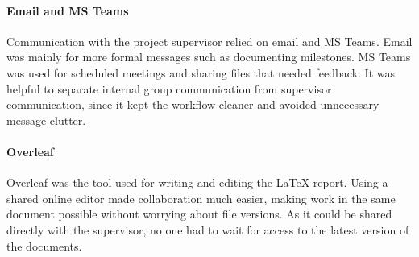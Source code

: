 \paragraph{Email and MS Teams}
Communication with the project supervisor relied on email and MS Teams. Email was mainly for more formal messages such as documenting milestones. MS Teams was used for scheduled meetings and sharing files that needed feedback. It was helpful to separate internal group communication from supervisor communication, since it kept the workflow cleaner and avoided unnecessary message clutter.

\paragraph{Overleaf}
Overleaf was the tool used for writing and editing the \LaTeX{} report. Using a shared online editor made collaboration much easier, making work in the same document possible without worrying about file versions. As it could be shared directly with the supervisor, no one had to wait for access to the latest version of the documents.